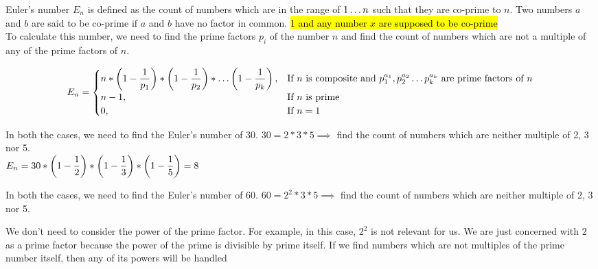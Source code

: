 Euler's number $E_n$ is defined as the count of numbers which are in the range of ${1} \ldots {n}$ such that they are co-prime to $n$. Two numbers $a$ and $b$ are said to be co-prime if $a$ and $b$ have no factor in common. \hl{1 and any number $x$ are supposed to be co-prime} \\

To calculate this number, we need to find the prime factors $p_i$ of the number $n$ and find the count of numbers which are not a multiple of any of the prime factors of $n$.

\begin{equation*}
    E_n = 
    \begin{cases}
        n * \left ( 1 - \dfrac{1}{p_1} \right ) * \left ( 1 - \dfrac{1}{p_2} \right ) * \ldots \left ( 1 - \dfrac{1}{p_k} \right ), & \text{If $n$ is composite and $p_1^{a_1},p_2^{a_2} \ldots p_k^{a_k}$ are prime factors of $n$} \\

        n-1, & \text{If $n$ is prime} \\
        
        0, & \text{If $n = 1$} \\
    \end{cases}
\end{equation*}


In both the cases, we need to find the Euler's number of 30. $30 = 2 * 3 * 5 \implies$ find the count of numbers which are neither multiple of 2, 3 nor 5. \\

$E_n = 30 * \left ( 1 - \dfrac{1}{2} \right ) * \left ( 1 - \dfrac{1}{3} \right ) * \left ( 1 - \dfrac{1}{5} \right ) = 8$


In both the cases, we need to find the Euler's number of 60. $60 = 2^2 * 3 * 5 \implies$ find the count of numbers which are neither multiple of 2, 3 nor 5. \\

\begin{NOTE}
    We don't need to consider the power of the prime factor. For example, in this case, $2^2$ is not relevant for us. We are just concerned with $2$ as a prime factor because the power of the prime is divisible by prime itself. If we find numbers which are not multiples of the prime number itself, then any of its powers will be handled
\end{NOTE}

